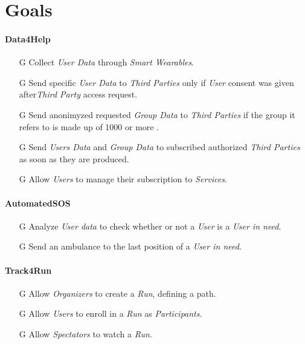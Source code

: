 \documentclass[../../rasd.tex]{subfiles}
\begin{document}
\section{Goals}

				\paragraph{Data4Help}
					\begin{itemize}
						
						\item[G\subs{1}]Collect \textit{User Data} through \textit{Smart Wearables}.
						
						\item[G\subs{2}]Send specific \textit{User Data} to \textit{Third Parties} only if \textit{User} consent was given after\textit{Third Party} access request.
						\item[G\subs{3}]Send anonimyzed requested \textit{Group Data} to \textit{Third Parties} if the group it refers to is made up of 1000 or more .

						\item[G\subs{4}]Send \textit{Users Data} and \textit{Group Data} to subscribed authorized \textit{Third Parties} as soon as they are produced.
						
						\item[G\subs{5}]Allow \textit{Users} to manage their subscription to \textit{Services}.		
						
					\end{itemize}

				\paragraph{AutomatedSOS}
					\begin{itemize}
						\item[G\subs{6}]Analyze \textit{User data} to check whether or not a \textit{User} is a \textit{User in need}.
						\item[G\subs{7}]Send an ambulance to the last position of a \textit{User in need}.
					\end{itemize}

				\paragraph{Track4Run}
					\begin{itemize}
						\item[G\subs{8}]Allow \textit{Organizers} to create a \textit{Run}, defining a path.
						\item[G\subs{9}]Allow \textit{Users} to enroll in a \textit{Run} as \textit{Participants}. 
						\item[G\subs{10}]Allow \textit{Spectators} to watch a \textit{Run}.
					\end{itemize}
\end{document}
